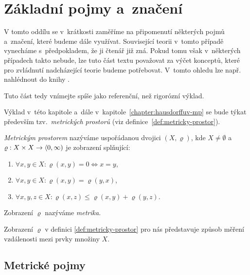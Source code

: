 \section{Základní pojmy a~značení}\label{sec:zakladni-pojmy-a-znaceni}

V tomto oddílu se v~krátkosti zaměříme na připomenutí některých pojmů a~značení, které budeme dále využívat. Související teorii v~tomto případě vynecháme s~předpokladem, že ji čtenář již zná. Pokud tomu však v~některých případech takto nebude, lze tuto část textu považovat za výčet konceptů, které pro zvládnutí nadcházející teorie budeme potřebovat. V~tomto ohledu lze např. nahlédnout do knihy \cite{NetukaAnalyza2014}.

Tuto část tedy vnímejte spíše jako referenční, než rigorózní výklad.

Výklad v~této kapitole a~dále v~kapitole~\ref{chapter:hausdorffuv-mp} se bude týkat především tzv.~\emph{metrických prostorů} (viz definice~\ref{def:metricky-prostor}).
\begin{definition}\label{def:metricky-prostor}
    \emph{Metrickým prostorem} nazýváme uspořádanou dvojici $(X,\varrho)$, kde $X\neq\emptyset$ a~$\varrho:X\times X \rightarrow \langle0,\infty)$ je zobrazení splňující:
    \begin{enumerate}[label=(\alph*)]
        \item $\forall x,y\in X: \varrho(x,y)=0\iff x=y$,
        \item $\forall x,y\in X: \varrho(x,y)=\varrho(y,x)$,
        \item $\forall x,y,z\in X: \varrho(x,z)\leqslant\varrho(x,y)+\varrho(y,z)$.
    \end{enumerate}
    Zobrazení $\varrho$ nazýváme \emph{metrika}.
\end{definition}
Zobrazení $\varrho$ v definici \ref{def:metricky-prostor} pro nás představuje způsob měření vzdálenosti mezi prvky množiny $X$. 

\subsection{Metrické pojmy}\label{subsec:metricke-pojmy}


